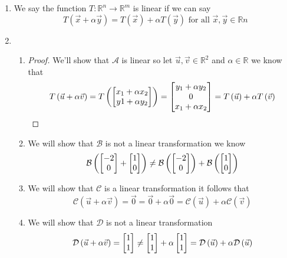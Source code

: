\documentclass[11pt]{book}
\begin{document}
\begin{enumerate}
    \item We say the function $T : \mathbb{R}^{n} \to \mathbb{R}^{m} $ is linear if we can say
    \begin{equation*}
        T\left(\vec{x} + \alpha\vec{y}\right) = T\left(\vec{x}\right) + \alpha T\left(\vec{y}\right) \text{ for all  } \vec{x}, \vec{y} \in \mathbb{R}n
    \end{equation*}
    \item
    \begin{enumerate}
        \item 
        \begin{proof}
            We'll show that $\mathcal{A}$ is linear so let $\vec{u}, \vec{v} \in \mathbb{R}^2$ and $\alpha \in \mathbb{R}$ we know that
            \begin{equation*}
                T\left(\vec{u} + \alpha \vec{v}\right) = T\left( \begin{bmatrix} x_1 + \alpha x_2 \\ y1 + \alpha y_2 \end{bmatrix}\right) = \begin{bmatrix} y_1 + \alpha y_2 \\ 0 \\ x_1 + \alpha x_2 \end{bmatrix} = T\left(\vec{u}\right) + \alpha T\left(\vec{v}\right)
            \end{equation*}
        \end{proof}
        \item We will show that $\mathcal{B}$ is not a linear transformation we know 
        \begin{equation*}
            \mathcal{B}\left(\begin{bmatrix} -2 \\ 0 \end{bmatrix} + \begin{bmatrix} 1 \\ 0 \end{bmatrix}\right) \neq \mathcal{B}\left(\begin{bmatrix} -2 \\ 0 \end{bmatrix}\right) + \mathcal{B}\left(\begin{bmatrix} 1 \\ 0 \end{bmatrix}\right)
        \end{equation*}
        \item We will show that $\mathcal{C}$ is a linear transformation it follows that 
        \begin{equation*}
            \mathcal{C}\left(\vec{u} + \alpha \vec{v}\right) = \vec{0} = \vec{0} + \alpha \vec{0} = \mathcal{C}\left(\vec{u}\right) + \alpha \mathcal{C}\left(\vec{v}\right)
        \end{equation*}
        \item We will show that $\mathcal{D}$ is not a linear transformation 
        \begin{equation*}
            \mathcal{D}\left(\vec{u} + \alpha \vec{v}\right) = \mat{ 1 \\ 1 } \neq \mat{ 1 \\ 1 } + \alpha \mat{ 1 \\ 1 } = \mathcal{D}\left(\vec{u}\right) + \alpha \mathcal{D}\left(\vec{u}\right)

\end{equation*}
\end{enumerate}
\end{enumerate}
\end{document}
